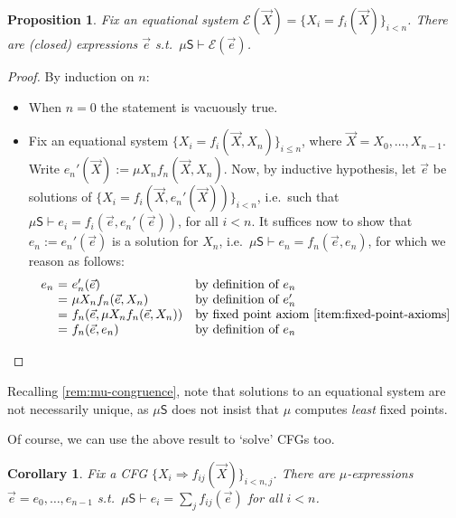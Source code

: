 \documentclass[a4paper,10pt]{amsart}
\newcommand{\df}{:=}
\newtheorem{proposition}[theorem]{Proposition}
\newtheorem{corollary}[theorem]{Corollary}
\theoremstyle{definition}
\newcommand{\Alphabet}{\mathcal{A}}
\newcommand{\Var}{\mathcal{V}}
\newcommand{\proves}{\vdash}
\newcommand{\basicax}{\mu\mathsf{S}}
\begin{document}
\begin{proposition}
\label{eq-systems-have-solns-in-basicax}
    Fix an equational system $\mathcal E(\vec X) = \{X_i = f_i(\vec X)\}_{i<n}$. 
    There are (closed) expressions $\vec e $ s.t.\ $\basicax \proves \mathcal E(\vec e)$. 
\end{proposition}
\begin{proof}
    By induction on $n$:
    \begin{itemize}
        \item When $n=0$ the statement is vacuously true.
        \item Fix an equational system $\{X_i = f_i(\vec X, X_n)\}_{i\leq n}$, where $\vec X = X_0, \dots, X_{n-1}$.
        Write $e_n'(\vec X) \df \mu X_n f_n (\vec X, X_n)$.
        Now, by inductive hypothesis, let $\vec e$ be solutions of $\{X_i = f_i(\vec X, e_n'(\vec X))\}_{i<n}$, i.e.\ such that $\basicax \proves e_i = f_i(\vec e, e_n'(\vec e))$, for all $i<n$.
        It suffices now to show that $e_n \df e_n'(\vec e) $ is a solution for $X_n$, i.e.\ $\basicax \proves e_n = f_n (\vec e, e_n)$, for which we reason as follows:
        \[
        \begin{array}{r@{\ = \ }ll}
             e_n & e_n' (\vec e) & \text{by definition of $e_n$} \\
                & \mu X_n f_n (\vec e, X_n) & \text{by definition of $e_n'$} \\
                & f_n (\vec e, \mu X_n f_n (\vec e, X_n)) & \text{by fixed point axiom \eqref{item:fixed-point-axioms}} \\
                & f_n (\vec e, e_n) & \text{by definition of $e_n$} \qedhere
        \end{array}
        \]
    \end{itemize}
\end{proof}

Recalling \cref{rem:mu-congruence}, note that solutions to an equational system are not necessarily unique, as $\basicax$ does not insist that $\mu$ computes \emph{least} fixed points.

Of course, we can use the above result to `solve' CFGs too.

\begin{corollary}
\label{cfgs-have-solutions-in-basicaxs}
    Fix a CFG $\{X_i \Rightarrow f_{ij} (\vec X)\}_{i<n, j}$.
    There are $\mu$-expressions $\vec e = e_0, \dots, e_{n-1}$ s.t.\ $\basicax \proves e_i = \sum_j f_{ij} ({\vec e})$ for all $i<n$.
\end{corollary}
\end{document}
